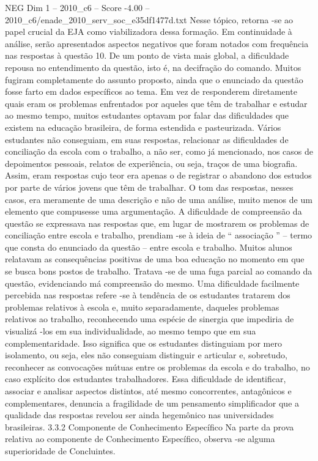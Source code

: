 \begin{textsample}{NEG Dim 1 – 2010\_c6 – Score -4.00 – 2010\_c6/enade\_2010\_serv\_soc\_e35df1477d.txt}
Nesse tópico, retorna -se ao papel crucial da EJA como viabilizadora dessa formação.
Em continuidade à análise, serão apresentados aspectos negativos que foram notados com frequência nas respostas à questão 10.
De um ponto de vista mais global, a dificuldade repousa no entendimento da questão, isto é, na decifração do comando.
Muitos fugiram completamente do assunto proposto, ainda que o enunciado da questão fosse farto em dados específicos ao tema.
Em vez de responderem diretamente quais eram os problemas enfrentados por aqueles que têm de trabalhar e estudar ao mesmo tempo, muitos estudantes optavam por falar das dificuldades que existem na educação brasileira, de forma estendida e pasteurizada.
Vários estudantes não conseguiam, em suas respostas, relacionar as dificuldades de conciliação da escola com o trabalho, a não ser, como já mencionado, nos casos de depoimentos pessoais, relatos de experiência, ou seja, traços de uma biografia.
Assim, eram respostas cujo teor era apenas o de registrar o abandono dos estudos por parte de vários jovens que têm de trabalhar.
O tom das respostas, nesses casos, era meramente de uma descrição e não de uma análise, muito menos de um elemento que compusesse uma argumentação.
A dificuldade de compreensão da questão se expressava nas respostas que, em lugar de mostrarem os problemas de conciliação entre escola e trabalho, prendiam -se à ideia de “ associação ” – termo que consta do enunciado da questão – entre escola e trabalho.
Muitos alunos relatavam as consequências positivas de uma boa educação no momento em que se busca bons postos de trabalho.
Tratava -se de uma fuga parcial ao comando da questão, evidenciando má compreensão do mesmo.
Uma dificuldade facilmente percebida nas respostas refere -se à tendência de os estudantes tratarem dos problemas relativos à escola e, muito separadamente, daqueles problemas relativos ao trabalho, reconhecendo uma espécie de sinergia que impediria de visualizá -los em sua individualidade, ao mesmo tempo que em sua complementaridade.
Isso significa que os estudantes distinguiam por mero isolamento, ou seja, eles não conseguiam distinguir e articular e, sobretudo, reconhecer as convocações mútuas entre os problemas da escola e do trabalho, no caso explícito dos estudantes trabalhadores.
Essa dificuldade de identificar, associar e analisar aspectos distintos, até mesmo concorrentes, antagônicos e complementares, denuncia a fragilidade de um pensamento simplificador que a qualidade das respostas revelou ser ainda hegemônico nas universidades brasileiras. 3.3.2 Componente de Conhecimento Específico Na parte da prova relativa ao componente de Conhecimento Específico, observa -se alguma superioridade de Concluintes.

\end{textsample}
